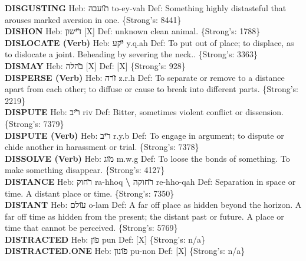{\textbf{DISGUSTING} Heb: {\large\H תועבה} to-ey-vah Def: Something highly distasteful that arouses marked aversion in one. \{Strong's: 8441\}\hfill{}\\

\textbf{DISHON} Heb: {\large\H דישון} {[}X{]} Def: unknown clean animal. \{Strong's: 1788\}\hfill{}\\

\textbf{DISLOCATE (Verb)} Heb: {\large\H יקע} y.q.ah Def: To put out of place; to displace, as to dislocate a joint. Beheading by severing the neck.. \{Strong's: 3363\}\hfill{}\\

\textbf{DISMAY} Heb: {\large\H בהלה} {[}X{]} Def: {[}X{]} \{Strong's: 928\}\hfill{}\\

\textbf{DISPERSE (Verb)} Heb: {\large\H זרה} z.r.h Def: To separate or remove to a distance apart from each other; to diffuse or cause to break into different parts. \{Strong's: 2219\}\hfill{}\\

\textbf{DISPUTE} Heb: {\large\H ריב} riv Def: Bitter, sometimes violent conflict or dissension. \{Strong's: 7379\}\hfill{}\\

\textbf{DISPUTE (Verb)} Heb: {\large\H ריב} r.y.b Def: To engage in argument; to dispute or chide another in harassment or trial. \{Strong's: 7378\}\hfill{}\\

\textbf{DISSOLVE (Verb)} Heb: {\large\H מוג} m.w.g Def: To loose the bonds of something. To make something disappear. \{Strong's: 4127\}\hfill{}\\

\textbf{DISTANCE} Heb: {\large\H רחוק} ra-hhoq \textbf{\textbackslash{}} {\large\H רחוקה} re-hho-qah Def: Separation in space or time. A distant place or time. \{Strong's: 7350\}\hfill{}\\

\textbf{DISTANT} Heb: {\large\H עולם} o-lam Def: A far off place as hidden beyond the horizon. A far off time as hidden from the present; the distant past or future. A place or time that cannot be perceived. \{Strong's: 5769\}\hfill{}\\

\textbf{DISTRACTED} Heb: {\large\H פון} pun Def: {[}X{]} \{Strong's: n/a\}\hfill{}\\

\textbf{DISTRACTED.ONE} Heb: {\large\H פונון} pu-non Def: {[}X{]} \{Strong's: n/a\}\hfill{}\\

}
